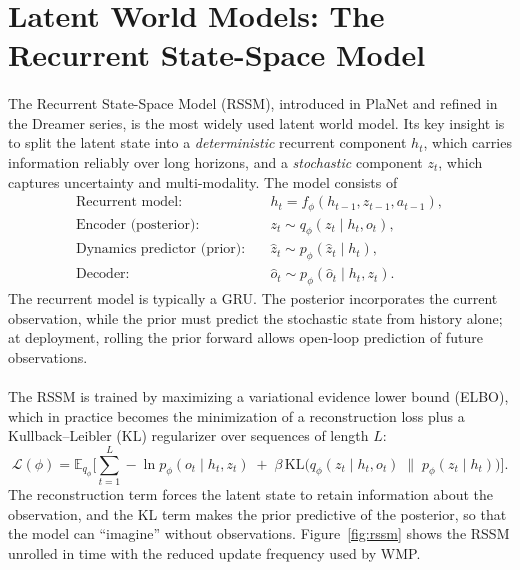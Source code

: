 \documentclass[12pt,a4paper,final]{extreport}
\begin{document}
\section{Latent World Models: The Recurrent State-Space Model}

\paragraph{} The Recurrent State-Space Model (RSSM), introduced in PlaNet and refined in the Dreamer series, is the most widely used latent world model. Its key insight is to split the latent state into a \emph{deterministic} recurrent component $h_t$, which carries information reliably over long horizons, and a \emph{stochastic} component $z_t$, which captures uncertainty and multi-modality. The model consists of
\begin{align}
\text{Recurrent model:}\quad & h_t = f_\phi(h_{t-1}, z_{t-1}, a_{t-1}), \\
\text{Encoder (posterior):}\quad & z_t \sim q_\phi(z_t \mid h_t, o_t), \\
\text{Dynamics predictor (prior):}\quad & \hat{z}_t \sim p_\phi(\hat{z}_t \mid h_t), \\
\text{Decoder:}\quad & \hat{o}_t \sim p_\phi(\hat{o}_t \mid h_t, z_t).
\end{align}
The recurrent model is typically a GRU. The posterior incorporates the current observation, while the prior must predict the stochastic state from history alone; at deployment, rolling the prior forward allows open-loop prediction of future observations.

\paragraph{} The RSSM is trained by maximizing a variational evidence lower bound (ELBO), which in practice becomes the minimization of a reconstruction loss plus a Kullback--Leibler (KL) regularizer over sequences of length $L$:
\begin{equation}
\mathcal{L}(\phi)=\mathbb{E}_{q_\phi}\Big[\sum_{t=1}^{L} -\ln p_\phi(o_t\mid h_t,z_t) \;+\; \beta\,\mathrm{KL}\big(q_\phi(z_t\mid h_t,o_t)\;\|\;p_\phi(z_t\mid h_t)\big)\Big].
\label{eq:rssm_loss}
\end{equation}
The reconstruction term forces the latent state to retain information about the observation, and the KL term makes the prior predictive of the posterior, so that the model can ``imagine'' without observations. Figure~\ref{fig:rssm} shows the RSSM unrolled in time with the reduced update frequency used by WMP.
\end{document}
